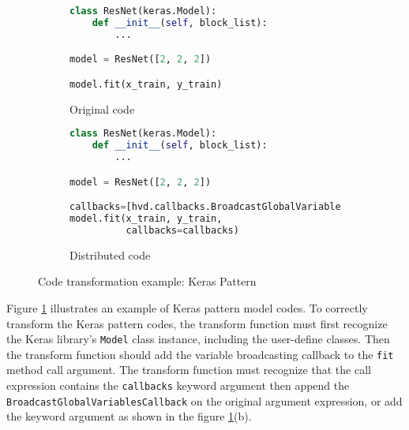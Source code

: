 \begin{figure}[ht!]
  \begin{subfigure}[t]{0.45\textwidth}
  \begin{lstlisting}[language=Python]
class ResNet(keras.Model):
    def __init__(self, block_list):
        ...

model = ResNet([2, 2, 2])

model.fit(x_train, y_train)
  \end{lstlisting}
  \caption{Original code}
  \end{subfigure}
  \hspace{3mm}
  \begin{subfigure}[t]{0.45\textwidth}
  \begin{lstlisting}[language=Python]
class ResNet(keras.Model):
    def __init__(self, block_list):
        ...

model = ResNet([2, 2, 2])

callbacks=[hvd.callbacks.BroadcastGlobalVariablesCallback(0)
model.fit(x_train, y_train,
          callbacks=callbacks)
  \end{lstlisting}
    \caption{Distributed code}
  \end{subfigure}
  \caption{Code transformation example: Keras Pattern}
  \label{fig:trans:keras}
\end{figure}


Figure \ref{fig:trans:keras} illustrates an example of Keras pattern model
codes.
To correctly transform the Keras pattern codes,
the transform function must first recognize the Keras library's {\tt Model} 
class instance, including the user-define classes.
Then the transform function should add the variable broadcasting callback to
the {\tt fit} method call argument.
The transform function must recognize that the call expression
contains the {\tt callbacks} keyword argument then append the
{\tt BroadcastGlobalVariablesCallback} on the original argument expression,
or add the keyword argument as shown in the figure \ref{fig:trans:keras}(b).

